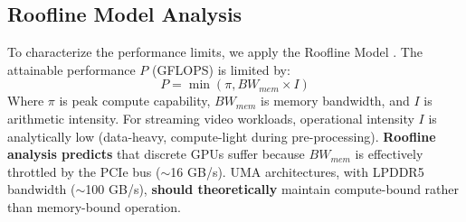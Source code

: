 \documentclass[conference]{IEEEtran}
\begin{document}
\subsection{Roofline Model Analysis}

To characterize the performance limits, we apply the Roofline Model \cite{b2}. The attainable performance $P$ (GFLOPS) is limited by:
\begin{equation}
P = \min(\pi, BW_{mem} \times I)
\end{equation}
Where $\pi$ is peak compute capability, $BW_{mem}$ is memory bandwidth, and $I$ is arithmetic intensity. 
For streaming video workloads, operational intensity $I$ is analytically low (data-heavy, compute-light during pre-processing). \textbf{Roofline analysis predicts} that discrete GPUs suffer because $BW_{mem}$ is effectively throttled by the PCIe bus ($\sim$16 GB/s). UMA architectures, with LPDDR5 bandwidth ($\sim$100 GB/s), \textbf{should theoretically} maintain compute-bound rather than memory-bound operation.
\end{document}
